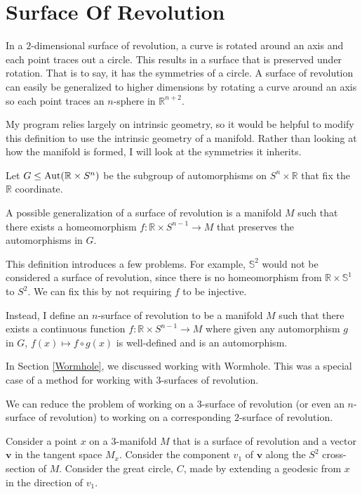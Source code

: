 \section{Surface Of Revolution}

In a $2$-dimensional surface of revolution, a curve is rotated around an axis and each point traces out a circle. This results in a surface that is preserved under rotation. That is to say, it has the symmetries of a circle. A surface of revolution can easily be generalized to higher dimensions by rotating a curve around an axis so each point traces an $n$-sphere in $\mathbb{R}^{n+2}$.

My program relies largely on intrinsic geometry, so it would be helpful to modify this definition to use the intrinsic geometry of a manifold. Rather than looking at how the manifold is formed, I will look at the symmetries it inherits.

Let $G \leq \operatorname*{Aut}(\mathbb{R} \times S^n)$ be the subgroup of automorphisms on $S^n \times \mathbb{R}$ that fix the $\mathbb{R}$ coordinate.

A possible generalization of a surface of revolution is a manifold $M$ such that there exists a homeomorphism $f:\mathbb{R} \times S^{n-1} \to M$ that preserves the automorphisms in $G$.

This definition introduces a few problems. For example, $\mathbb{S}^2$ would not be considered a surface of revolution, since there is no homeomorphism from $\mathbb{R} \times \mathbb{S}^1$ to $S^2$. We can fix this by not requiring $f$ to be injective.

Instead, I define an $n$-surface of revolution to be a manifold $M$ such that there exists a continuous function $f:\mathbb{R} \times S^{n-1} \to M$ where given any automorphism $g$ in $G$, $f(x) \mapsto f \circ g(x)$ is well-defined and is an automorphism.

In Section \ref{Wormhole}, we discussed working with Wormhole. This was a special case of a method for working with $3$-surfaces of revolution.

We can reduce the problem of working on a $3$-surface of revolution (or even an $n$-surface of revolution) to working on a corresponding $2$-surface of revolution.

Consider a point $x$ on a $3$-manifold $M$ that is a surface of revolution and a vector $\textbf{v}$ in the tangent space $M_x$. Consider the component $v_1$ of $\textbf{v}$ along the $S^2$ cross-section of $M$. Consider the great circle, $C$, made by extending a geodesic from $x$ in the direction of $v_1$.

